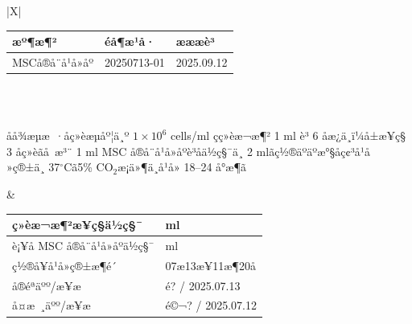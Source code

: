 \documentclass[UTF8,10pt,a4paper,fontset=fandol]{ctexart}
\newcommand{\fieldvalue}[1]{#1}
\newcommand{\handwritten}[1]{#1}
\begin{document}
\begin{center}
\begin{tabularx}{\textwidth}{|X|}
\hline
{} \\ \hline
\begin{tabularx}{\linewidth}{|X|X|X|}
\hline
æº¶æ¶² & éå¶æ¹å· & æææè³ \\ \hline
\fieldvalue{MSCå®å¨å¹å»åº} &
\fieldvalue{\handwritten{20250713-01}} &
\fieldvalue{\handwritten{2025.09.12}}
\\ \hline
\end{tabularx}
\\ \hline
{} \\ \hline
\begin{minipage}{0.52\linewidth}
åå¾æµæ ·åç»èæµåº¦ä¸º $1\times10^{6}$ cells/ml çç»èæ¬æ¶²
1 ml è³ 6 å­æ¿ä¸­ï¼å±æ¥ç§ 3 å­ç»èãå æ³¨ 1 ml MSC
å®å¨å¹å»åºè³åä½ç§¯ä¸­ 2 mlãç½®äºäºæ°§åç¢³å¹å»ç®±ä¸­
37$^\circ$Cã5\% CO$_2$æ¡ä»¶ä¸å¹å» 18--24 å°æ¶ã
\end{minipage}
&
\begin{tabularx}{0.48\linewidth}{|l|X|}
\hline
ç»èæ¬æ¶²æ¥ç§ä½ç§¯ & \hspace{1cm} ml \\ \hline
è¡¥å MSC å®å¨å¹å»åºä½ç§¯ & \hspace{1cm} ml \\ \hline
ç½®å¥å¹å»ç®±æ¶é´ &
\fieldvalue{\handwritten{07æ13æ¥11æ¶20å}}
\\ \hline
å®éªäºº/æ¥æ &
\fieldvalue{\handwritten{é­?}} /
\fieldvalue{\handwritten{2025.07.13}}
\\ \hline
å¤æ ¸äºº/æ¥æ &
\fieldvalue{\handwritten{é©¬?}} /
\fieldvalue{\handwritten{2025.07.12}}
\\ \hline
\end{tabularx}
\\ \hline
{} \\ \hline
\end{tabularx}
\end{center}
\end{document}
